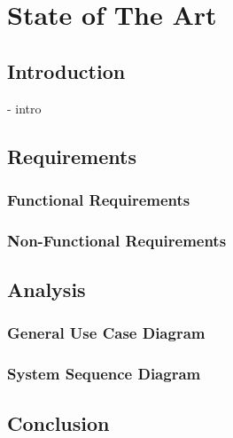 

\chapter{State of The Art}

\ifpdf
    \graphicspath{{Chapter3/Figs/Raster/}{Chapter3/Figs/PDF/}{Chapter3/Figs/}}
\else
    \graphicspath{{Chapter3/Figs/Vector/}{Chapter3/Figs/}}
\fi


\section{Introduction}
- intro

\section{Requirements}
    \subsection{Functional Requirements}
    \subsection{Non-Functional Requirements}

\section{Analysis}
    \subsection{General Use Case Diagram}
    \subsection{System Sequence Diagram}

\section{Conclusion}